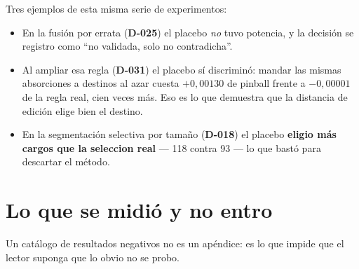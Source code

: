 \documentclass[12pt,a4paper]{report}
\newcommand{\dref}[1]{\textbf{D-#1}}
\begin{document}
Tres ejemplos de esta misma serie de experimentos:

\begin{itemize}[nosep]
  \item En la fusión por errata (\dref{025}) el placebo \emph{no} tuvo potencia, y
        la decisión se registro como ``no validada, solo no contradicha''.
  \item Al ampliar esa regla (\dref{031}) el placebo sí discriminó: mandar las
        mismas absorciones a destinos al azar cuesta $+0{,}00130$ de pinball
        frente a $-0{,}00001$ de la regla real, cien veces más. Eso es lo que
        demuestra que la distancia de edición elige bien el destino.
  \item En la segmentación selectiva por tamaño (\dref{018}) el placebo
        \textbf{eligio más cargos que la seleccion real} --- 118 contra 93 --- lo
        que bastó para descartar el método.
\end{itemize}

\chapter{Lo que se midió y no entro}

Un catálogo de resultados negativos no es un apéndice: es lo que impide que el
lector suponga que lo obvio no se probo.
\end{document}
